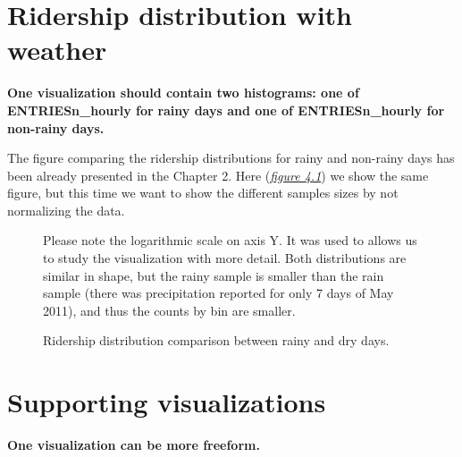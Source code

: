 \documentclass[a4paper,12pt,english]{sphinxmanual}
\begin{document}
\section{Ridership distribution with weather}
\label{section3:ridership-distribution-with-weather}
\textbf{One visualization should contain two histograms: one of  ENTRIESn\_hourly for}
\textbf{rainy days and one of ENTRIESn\_hourly for non-rainy days.}

The figure comparing the ridership distributions for rainy and non-rainy days
has been already presented in the Chapter 2. Here ({\hyperref[section3:figure42]{\emph{figure 4.1}}})
we show the same figure, but this time we want to show the different samples sizes
by not normalizing the data.
\begin{figure}[htbp]
\centering
\capstart

\caption{Ridership distribution comparison between rainy and dry days.}{\small 
Please note the logarithmic scale on axis Y. It was used to allows us to
study the visualization with more detail. Both distributions are similar in
shape, but the rainy sample is smaller than the rain sample (there was
precipitation reported for only 7 days of May 2011), and thus the counts
by bin are smaller.
}\label{section3:figure41}\end{figure}


\section{Supporting visualizations}
\label{section3:supporting-visualizations}
\textbf{One visualization can be more freeform.}
\end{document}
